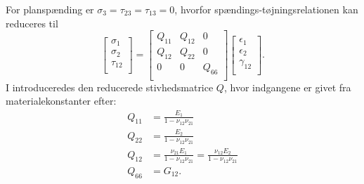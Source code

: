 For planspænding er $\sigma_3 = \tau_{23} = \tau_{13} = 0$, hvorfor spændings-tøjningsrelationen kan reduceres til
\begin{equation} \label{eq:planspænding}
  \begin{bmatrix}
    \sigma_1\\
  \sigma_2\\
  \tau_{12}\\
  \end{bmatrix} = \begin{bmatrix}
    Q_{11} & Q_{12} & 0\\
  Q_{12} & Q_{22} & 0\\
  0 & 0 & Q_{66}\\
  \end{bmatrix} \begin{bmatrix}
    \epsilon_1\\
  \epsilon_2\\
  \gamma_{12}\\
  \end{bmatrix}
.\end{equation}
I  introduceredes den reducerede stivhedsmatrice $Q$, hvor indgangene er givet fra materialekonstanter efter:
\begin{align*}
  Q_{11} &= \frac{E_1}{1 - \nu_{12} \nu_{21}} \\
  Q_{22} &= \frac{E_2}{1 - \nu_{12} \nu_{21}} \\
  Q_{12} &= \frac{\nu_{21}E_1}{1 - \nu_{12}\nu_{21}} = \frac{\nu_{12} E_2}{1 - \nu_{12}\nu_{21}} \\
  Q_{66} &= G_{12}
.\end{align*}
